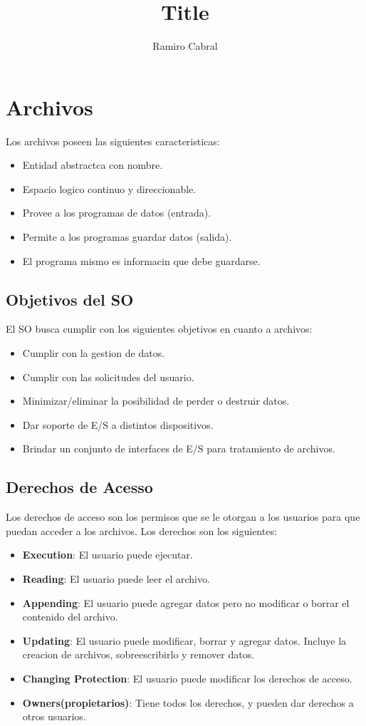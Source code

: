 \documentclass[12pt]{article}
\title{\Huge{Title}}
\author{\huge{Ramiro Cabral}}
\date{\huge{}}
\begin{document}
\section{Archivos}
Los archivos poseen las siguientes caracteristicas:
\begin{itemize}
    \item Entidad abstractca con nombre.
    \item Espacio logico continuo y direccionable.
    \item Provee a los programas de datos (entrada).
    \item Permite a los programas guardar datos (salida).
    \item El programa mismo es informacin que debe guardarse.
\end{itemize}

\subsection{Objetivos del SO}
El SO busca cumplir con los siguientes objetivos en cuanto a archivos:
\begin{itemize}
    \item Cumplir con la gestion de datos.
    \item Cumplir con las solicitudes del usuario.
    \item Minimizar/eliminar la posibilidad de perder o destruir datos.
    \item Dar soporte de E/S a distintos dispositivos.
    \item Brindar un conjunto de interfaces de E/S para tratamiento de archivos.
\end{itemize}

\subsection{Derechos de Acesso}
Los derechos de acceso son los permisos que se le otorgan a los usuarios para que puedan acceder a los archivos.
Los derechos son los siguientes:
\begin{itemize}
    \item \textbf{Execution}: El usuario puede ejecutar.
    \item \textbf{Reading}: El usuario puede leer el archivo.
    \item \textbf{Appending}: El usuario puede agregar datos pero no modificar o borrar el contenido del archivo.
    \item \textbf{Updating}: El usuario puede modificar, borrar y agregar datos. Incluye la creacion de archivos, sobreescribirlo y remover datos.
    \item \textbf{Changing Protection}: El usuario puede modificar los derechos de acceso.
    \item \textbf{Owners(propietarios)}: Tiene todos los derechos, y pueden dar derechos a otros usuarios.
\end{itemize}
\end{document}
